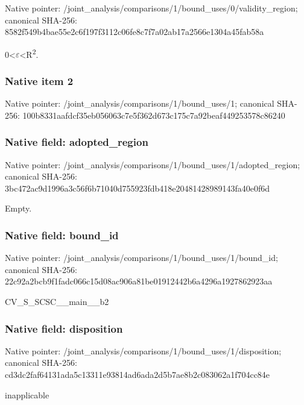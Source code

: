 \documentclass[10pt,a4paper]{article}
\begin{document}
Native pointer: /joint\_analysis/comparis\allowbreak{}ons/1/bound\_uses/0/valid\allowbreak{}ity\_region; canonical SHA-256: 8582f549b4bae55e2c6f197f\allowbreak{}3112c06fe8c7f7a02ab17a25\allowbreak{}66e1304a45fab58a


0<\ensuremath{\varepsilon}<R\textsuperscript{2}.


\subsubsection{Native item 2}


Native pointer: /joint\_analysis/comparis\allowbreak{}ons/1/bound\_uses/1; canonical SHA-256: 100b8331aafdcf35eb056063\allowbreak{}c7e5f362d673c175c7a92bea\allowbreak{}f449253578c86240



\subsubsection{Native field: adopted\_region}


Native pointer: /joint\_analysis/comparis\allowbreak{}ons/1/bound\_uses/1/adopt\allowbreak{}ed\_region; canonical SHA-256: 3bc472ac9d1996a3c56f6b71\allowbreak{}040d755923fdb418e2048142\allowbreak{}8989143fa40e0f6d


Empty.


\subsubsection{Native field: bound\_id}


Native pointer: /joint\_analysis/comparis\allowbreak{}ons/1/bound\_uses/1/bound\allowbreak{}\_id; canonical SHA-256: 22c92a2bcb9f1fadc066c15d\allowbreak{}08ac906a81be01912442b6a4\allowbreak{}296a1927862923aa


CV\_S\_SCSC\_\_main\_\_b2


\subsubsection{Native field: disposition}


Native pointer: /joint\_analysis/comparis\allowbreak{}ons/1/bound\_uses/1/dispo\allowbreak{}sition; canonical SHA-256: cd3dc2faf64131ada5c13311\allowbreak{}e93814ad6ada2d5b7ae8b2c0\allowbreak{}83062a1f704cc84e


inapplicable
\end{document}
